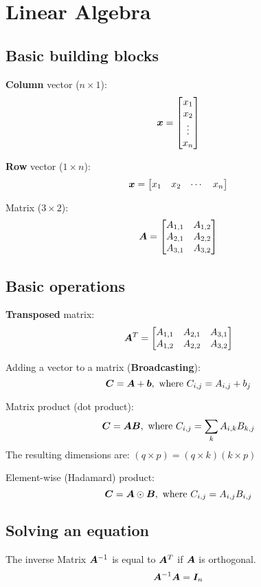 \section{Linear Algebra}

\begin{multicols}{2}
	\subsection{Basic building blocks}
	\textbf{Column} vector ($n\times 1$):
	\[ \bol{x} = \begin{bmatrix} x_1\\x_2\\\vdots\\x_n \end{bmatrix}  \]
	
	\textbf{Row} vector ($1\times n$):
	\[ \bol{x} = \begin{bmatrix} x_1&x_2&\cdots&x_n \end{bmatrix}  \]
	
	Matrix ($3\times 2$):
	\[ \bol{A} = 
	\begin{bmatrix} 
		A_{1,1} & A_{1,2} \\
		A_{2,1} & A_{2,2} \\
		A_{3,1} & A_{3,2}		
	\end{bmatrix}  \]
	
	\subsection{Basic operations}
	\textbf{Transposed} matrix:
	\[ \bol{A}^T = 
	\begin{bmatrix} 
	A_{1,1} & A_{2,1} & A_{3,1} \\
	A_{1,2} & A_{2,2} & A_{3,2}
	\end{bmatrix}  \]
	
	Adding a vector to a matrix (\textbf{Broadcasting}):
	\[ \bol{C} = \bol{A} + \bol{b}, \text{ where } C_{i,j} = A_{i,j} + b_j \]
	
	Matrix product (dot product):
	\[ \bol{C} = \bol{A}\bol{B}, \text{ where } C_{i,j} = \sum_k A_{i,k} B_{k,j} \]
	The resulting dimensions are: $(q\times p)=(q\times k)(k\times p)$
	
	Element-wise (Hadamard) product: 
	\[ \bol{C} = \bol{A} \odot \bol{B}, \text{ where } C_{i,j}=A_{i,j}B_{i,j} \]
	
	\subsection{Solving an equation}
	The inverse Matrix $\bol{A}^{-1}$ is equal to $\bol{A}^T$ if $\bol{A}$ is orthogonal.
	\[ \bol{A}^{-1}\bol{A} = \bol{I}_n \]
	

\end{multicols}
